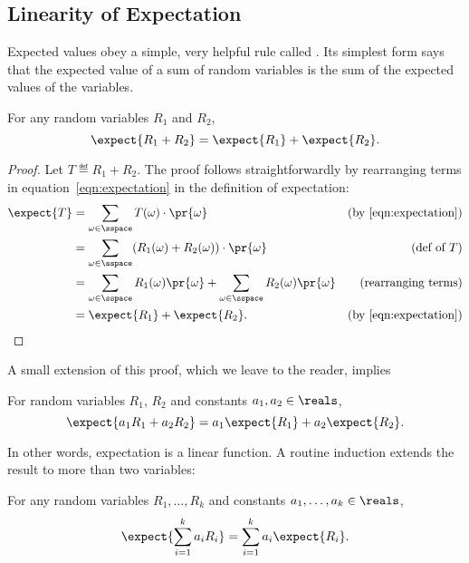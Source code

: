 \subsection{Linearity of Expectation}\label{finlin}

Expected values obey a simple, very helpful rule called
.  Its simplest form says that the
expected value of a sum of random variables is the sum of the expected
values of the variables.

\begin{theorem}\label{expsum-2}
For any random variables $R_1$ and $R_2$,
\[
\expect{R_1 + R_2} = \expect{R_1} + \expect{R_2}.
\]
\end{theorem}

\begin{proof}
Let $T \eqdef R_1+R_2$.  The proof follows straightforwardly by
rearranging terms in equation~\eqref{eqn:expectation} in the
definition of expectation:
\begin{align*}
\expect{T}
     & = \sum_{\omega \in \sspace} T(\omega) \cdot \pr{\omega}
                & \text{(by~\eqref{eqn:expectation})}\\
        & = \sum_{\omega \in \sspace} (R_1(\omega) + R_2(\omega)) \cdot \pr{\omega}
                         & \text{(def of $T$)}\\
        & = \sum_{\omega \in \sspace} R_1(\omega) \pr{\omega} + 
              \sum_{\omega \in \sspace} R_2(\omega) \pr{\omega} & \text{(rearranging terms)}\\
        & = \expect{R_1} + \expect{R_2}.
                & \text{(by~\ref{eqn:expectation})}
\end{align*}
\end{proof}

A small extension of this proof, which we leave to the reader, implies
\begin{theorem}
For random variables $R_1$, $R_2$ and constants $a_1,a_2 \in \reals$,
\[
\expect{a_1R_1 + a_2R_2} = a_1\expect{R_1} + a_2\expect{R_2}.
\]
\end{theorem}
In other words, expectation is a linear function.  A routine induction
extends the result to more than two variables:
\begin{corollary}\label{linexp-k-thm}
For any random variables $R_1, \dots, R_k$ and constants $a_1, \dots, a_k
\in \reals$,
\[
\expect{\sum_{i=1}^k a_iR_i} = \sum_{i=1}^k a_i\expect{R_i}.
\]
\end{corollary}

